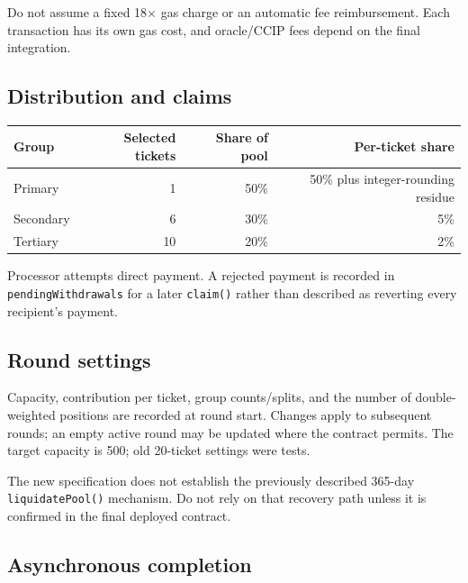 \documentclass[
  10pt,
  letterpaper,
]{article}
\begin{document}
Do not assume a fixed 18× gas charge or an automatic fee reimbursement.
Each transaction has its own gas cost, and oracle/CCIP fees depend on
the final integration.

\subsection{Distribution and claims}\label{distribution-and-claims}

\begin{longtable}[]{@{}lrrr@{}}
\toprule\noalign{}
Group & Selected tickets & Share of pool & Per-ticket share \\
\midrule\noalign{}
\endhead
\bottomrule\noalign{}
\endlastfoot
Primary & 1 & 50\% & 50\% plus integer-rounding residue \\
Secondary & 6 & 30\% & 5\% \\
Tertiary & 10 & 20\% & 2\% \\
\end{longtable}

Processor attempts direct payment. A rejected payment is recorded in
\texttt{pendingWithdrawals} for a later \texttt{claim()} rather than
described as reverting every recipient's payment.

\subsection{Round settings}\label{round-settings}

Capacity, contribution per ticket, group counts/splits, and the number
of double-weighted positions are recorded at round start. Changes apply
to subsequent rounds; an empty active round may be updated where the
contract permits. The target capacity is 500; old 20-ticket settings
were tests.

The new specification does not establish the previously described
365-day \texttt{liquidatePool()} mechanism. Do not rely on that recovery
path unless it is confirmed in the final deployed contract.

\subsection{Asynchronous completion}\label{asynchronous-completion}
\end{document}

